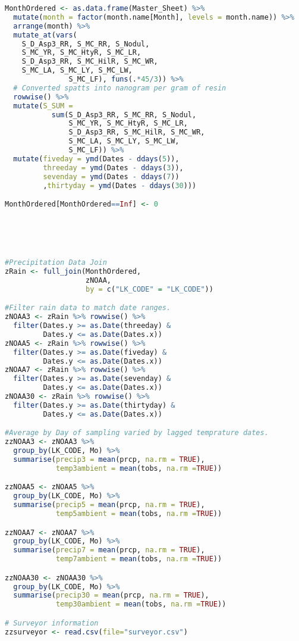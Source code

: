 \begin{lstlisting}[language=R, basicstyle=\small\ttfamily]
MonthOrdered <- as.data.frame(Master_Sheet) %>%
  mutate(month = factor(month.name[Month], levels = month.name)) %>%
  arrange(month) %>%
  mutate_at(vars(
    S_D_Asp3_RR, S_MC_RR, S_Nodul,
    S_MC_YR, S_MC_HtyR, S_MC_LR,
    S_D_Asp3_RR, S_MC_HilR, S_MC_WR,
    S_MC_LA, S_MC_LY, S_MC_LW,
               S_MC_LF), funs(.*45/3)) %>%
  # Converted spatts into nanogram per gram of resin
  rowwise() %>%
  mutate(S_SUM =
           sum(S_D_Asp3_RR, S_MC_RR, S_Nodul,
               S_MC_YR, S_MC_HtyR, S_MC_LR,
               S_D_Asp3_RR, S_MC_HilR, S_MC_WR,
               S_MC_LA, S_MC_LY, S_MC_LW,
               S_MC_LF)) %>%
  mutate(fiveday = ymd(Dates - ddays(5)),
         threeday = ymd(Dates - ddays(3)),
         sevenday = ymd(Dates - ddays(7))
         ,thirtyday = ymd(Dates - ddays(30)))

MonthOrdered[MonthOrdered==Inf] <- 0





#Precipitation Data Join
zRain <- full_join(MonthOrdered,
                   zNOAA,
                   by = c("LK_CODE" = "LK_CODE"))

#Filter rain data to match date ranges.
zNOAA3 <- zRain %>% rowwise() %>%
  filter(Dates.y >= as.Date(threeday) &
         Dates.y <= as.Date(Dates.x))
zNOAA5 <- zRain %>% rowwise() %>%
  filter(Dates.y >= as.Date(fiveday) &
         Dates.y <= as.Date(Dates.x))
zNOAA7 <- zRain %>% rowwise() %>%
  filter(Dates.y >= as.Date(sevenday) &
         Dates.y <= as.Date(Dates.x))
zNOAA30 <- zRain %>% rowwise() %>%
  filter(Dates.y >= as.Date(thirtyday) &
         Dates.y <= as.Date(Dates.x))

#Average by Day of sampling varied by lagged temprature dates.
zzNOAA3 <- zNOAA3 %>%
  group_by(LK_CODE, Mo) %>%
  summarise(precip3 = mean(prcp, na.rm = TRUE),
            temp3ambient = mean(tobs, na.rm =TRUE))

zzNOAA5 <- zNOAA5 %>%
  group_by(LK_CODE, Mo) %>%
  summarise(precip5 = mean(prcp, na.rm = TRUE),
            temp5ambient = mean(tobs, na.rm =TRUE))

zzNOAA7 <- zNOAA7 %>%
  group_by(LK_CODE, Mo) %>%
  summarise(precip7 = mean(prcp, na.rm = TRUE),
            temp7ambient = mean(tobs, na.rm =TRUE))

zzNOAA30 <- zNOAA30 %>%
  group_by(LK_CODE, Mo) %>%
  summarise(precip30 = mean(prcp, na.rm = TRUE),
            temp30ambient = mean(tobs, na.rm =TRUE))

# Surveyor information
zzsurveyor <- read.csv(file="surveyor.csv")


\end{lstlisting}
